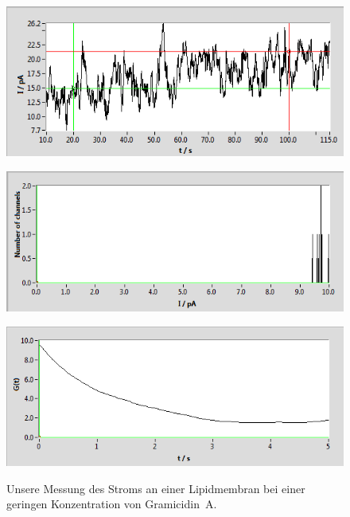 \documentclass[a4paper,ngerman]{scrartcl}
\begin{document}
\begin{figure}[tbh!]
  \centering
  \begin{minipage}[b]{.6\textwidth}
    \includegraphics[width=1.\textwidth]{abbildungen/einkanal-fail_raw.png}
    \label{fig:einkanalfail-roh}
  \end{minipage}
  \begin{minipage}[b]{.6\textwidth}
    \includegraphics[width=1.\textwidth]{abbildungen/einkanal-fail_hist.png}
    \label{fig:einkanalfail-hist}
  \end{minipage}
  \begin{minipage}[b]{.6\textwidth}
    \includegraphics[width=1.\textwidth]{abbildungen/einkanal_autokorrel_cut.png}
    \label{fig:einkanalfail-autocorr}
  \end{minipage}
\caption{Unsere Messung des Stroms an einer Lipidmembran bei einer geringen Konzentration von Gramicidin~A.}
\label{fig:einkanalfail}
\end{figure}
\end{document}
